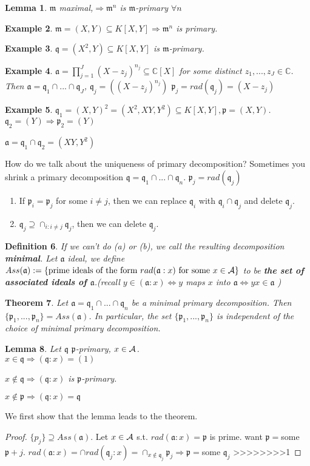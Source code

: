 \documentclass[11pt]{article}
\newtheorem{thm}{Theorem}[section]
\newtheorem{lemma}[thm]{Lemma}
\newtheorem{dfn}[thm]{Definition}
\newtheorem{ex}[thm]{Example}
\newcommand{\cplx}{\mathbb C}
\newcommand{\sca}{{\mathfrak a}}
\newcommand{\scm}{{\mathfrak m}}
\newcommand{\scp}{{\mathfrak p}}
\newcommand{\scq}{\mathfrak q}
\newcommand{\cala}{{\cal A}}
\newcommand{\Lrta}{\Longrightarrow}
\newcommand{\Llrta}{\Longleftrightarrow}
\begin{document}
\begin{lemma}
$\scm$ maximal,$\Lrta\scm^n$ is $\scm$-primary $\forall n$
\end{lemma}
\begin{ex}
$\scm=(X,Y)\subseteq K[X,Y]\Lrta \scm^n$ is primary.
\end{ex}
\begin{ex}
$\scq=(X^2,Y)\subseteq K[X,Y]$ is $\scm$-primary.
\end{ex}
\begin{ex}
$\sca=\prod^J_{j=1}(X-z_j)^{n_j}\subseteq \cplx[X]$ for some distinct $z_1,...,z_J\in\cplx$. Then $\sca=\scq_1\cap...\cap\scq_J$, $\scq_j=((X-z_j)^{n_j})$ $\scp_j=rad(\scq_j)=(X-z_j)$ 
\end{ex}
\begin{ex}
$\scq_1=(X,Y)^2=(X^2,XY,Y^2)\subseteq K[X,Y],\scp=(X,Y)$. $\scq_2=(Y)\Lrta \scp_2=(Y)$

$\sca=\scq_1\cap\scq_2=(XY,Y^2)$
\end{ex}

How do we talk about the uniqueness of primary decomposition?
Sometimes you shrink a primary decomposition $\scq=\scq_1\cap...\cap\scq_n$. $\scp_j=rad(\scq_j)$ 
\begin{enumerate}[label=(\alph*)]
\item If $\scp_i=\scp_j$ for some $i\neq j$, then we can replace $\scq_i$ with $\scq_i\cap\scq_j$ and delete $\scq_j$.
\item $\scq_j\supseteq \cap_{i:i\neq j}\scq_j$, then we can delete $\scq_j$.
\end{enumerate}
\begin{dfn}
If we can't do (a) or (b), we call the resulting decomposition \textbf{minimal}. Let $\sca$ ideal, we define $Ass(\sca):=\{\text{prime ideals of the form $rad(\sca:x)$ for some $x\in\cala$}\}$ to be \textbf{the set of associated ideals of $\sca$}.(recall $y\in(\sca:x)\Llrta y$ maps $x$ into $\sca\Llrta yx\in\sca$ )
\end{dfn}

\begin{thm}
Let $\sca=\scq_1\cap...\cap\scq_n$ be a minimal primary decomposition. Then $\{\scp_1,...,\scp_n\}=Ass(\sca)$. In particular, the set $\{\scp_1,...,\scp_n\}$ is independent of the choice of minimal primary decomposition.
\end{thm}

\begin{lemma}
Let $\scq$ $\scp$-primary, $x\in\cala$.\\

 $x\in\scq\Lrta(\scq:x)=(1)$

 $x\notin\scq\Lrta (\scq:x)$ is $\scp$-primary.

 $x\notin\scp\Lrta (\scq:x)=\scq$
\end{lemma}

We first show that the lemma leads to the theorem.
\begin{proof}
$\{p_j\}\supseteq Ass(\sca)$. Let $x\in\cala$ s.t. $rad(\sca:x)=\scp$ is prime. want $\scp=$some $\scp+j$. $rad(\sca:x)=\cap rad(\scq_j:x)=\cap_{x\notin\scq_j}\scp_j\Lrta\scp=$some $\scq_j$
>>>>>>>>1
\end{proof}
\end{document}
